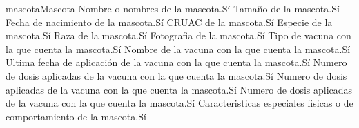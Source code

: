 \begin{cdtEntidad}{mascota}{Mascota}%
		{Nombre o nombres de la mascota.}{Sí}
		{Tamaño de la mascota.}{Sí}
		{Fecha de nacimiento de la mascota.}{Sí}
		{CRUAC de la mascota.}{Sí}
		{Especie de la mascota.}{Sí}
		{Raza de la mascota.}{Sí}
		{Fotografia de la mascota.}{Sí}
		{Tipo de vacuna con la que cuenta la mascota.}{Sí}
		{Nombre de la vacuna con la que cuenta la mascota.}{Sí}
		{Ultima fecha de aplicación de la vacuna con la que cuenta la mascota.}{Sí}
		{Numero de dosis aplicadas de la vacuna con la que cuenta la mascota.}{Sí}
		{Numero de dosis aplicadas de la vacuna con la que cuenta la mascota.}{Sí}
		{Numero de dosis aplicadas de la vacuna con la que cuenta la mascota.}{Sí}
		{Caracteristicas especiales fisicas o de comportamiento de la mascota.}{Sí}
\end{cdtEntidad}

